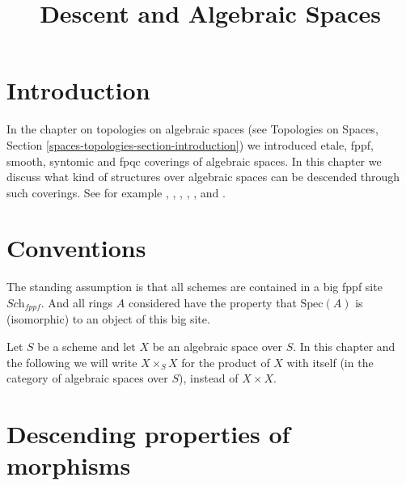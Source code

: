 

%


\title{Descent and Algebraic Spaces}

\maketitle

\label{section-phantom}

\tableofcontents

\section{Introduction}
\label{section-introduction}

\noindent
In the chapter on topologies on algebraic spaces (see
Topologies on Spaces, Section \ref{spaces-topologies-section-introduction})
we introduced etale, fppf, smooth, syntomic and fpqc coverings of
algebraic spaces.
In this chapter we discuss what kind of structures over algebraic spaces
can be descended through such coverings.
See for example \cite{Gr-I}, \cite{Gr-II}, \cite{Gr-III},
\cite{Gr-IV}, \cite{Gr-V}, and \cite{Gr-VI}.



\section{Conventions}
\label{section-conventions}

\noindent
The standing assumption is that all schemes are contained in
a big fppf site $\textit{Sch}_{fppf}$. And all rings $A$ considered
have the property that $\text{Spec}(A)$ is (isomorphic) to an
object of this big site.

\medskip\noindent
Let $S$ be a scheme and let $X$ be an algebraic space over $S$.
In this chapter and the following we will write $X \times_S X$
for the product of $X$ with itself (in the category of algebraic
spaces over $S$), instead of $X \times X$.













\section{Descending properties of morphisms}
\label{section-descending-properties-morphisms}

